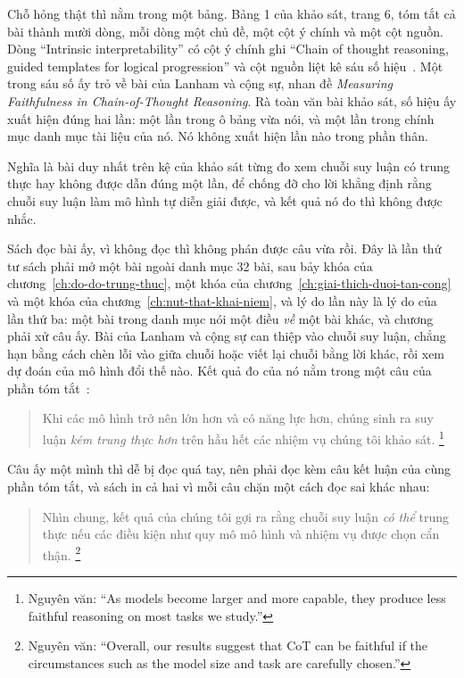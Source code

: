 %
Chỗ hỏng thật thì nằm trong một bảng. Bảng 1 của khảo sát, trang 6, tóm tắt cả
bài thành mười dòng, mỗi dòng một chủ đề, một cột ý chính và một cột nguồn. Dòng
\enquote{Intrinsic interpretability} có cột ý chính ghi \enquote{Chain of thought
reasoning, guided templates for logical progression} và cột nguồn liệt kê sáu số
hiệu~\autocite{p16llmxai}. Một trong sáu số ấy trỏ về bài của Lanham và cộng sự,
nhan đề \emph{Measuring Faithfulness in Chain-of-Thought Reasoning}. Rà toàn văn
bài khảo sát, số hiệu ấy xuất hiện đúng hai lần: một lần trong ô bảng vừa nói, và
một lần trong chính mục danh mục tài liệu của nó. Nó không xuất hiện lần nào
trong phần thân.

Nghĩa là bài duy nhất trên kệ của khảo sát từng đo xem chuỗi suy luận có trung
thực hay không được dẫn đúng một lần, để chống đỡ cho lời khẳng định rằng chuỗi
suy luận làm mô hình tự diễn giải được, và kết quả nó đo thì không được nhắc.

%
Sách đọc bài ấy, vì không đọc thì không phán được câu vừa rồi. Đây là lần thứ tư
sách phải mở một bài ngoài danh mục 32 bài, sau bảy khóa của
chương~\ref{ch:do-do-trung-thuc}, một khóa của
chương~\ref{ch:giai-thich-duoi-tan-cong} và một khóa của
chương~\ref{ch:nut-that-khai-niem}, và lý do lần này là lý do của lần thứ ba: một
bài trong danh mục nói một điều \emph{về} một bài khác, và chương phải xử câu ấy.
Bài của Lanham và cộng sự can thiệp vào chuỗi suy luận, chẳng hạn bằng cách chèn
lỗi vào giữa chuỗi hoặc viết lại chuỗi bằng lời khác, rồi xem dự đoán của mô hình
đổi thế nào. Kết quả đo của nó nằm trong một câu của phần tóm
tắt~\autocite{mcotfaith}:

\begin{quote}
Khi các mô hình trở nên lớn hơn và có năng lực hơn, chúng sinh ra suy luận
\emph{kém trung thực hơn} trên hầu hết các nhiệm vụ chúng tôi khảo sát.%
\footnote{Nguyên văn: \enquote{As models become larger and more capable, they
produce less faithful reasoning on most tasks we study.}}
\end{quote}

Câu ấy một mình thì dễ bị đọc quá tay, nên phải đọc kèm câu kết luận của cùng
phần tóm tắt, và sách in cả hai vì mỗi câu chặn một cách đọc sai khác nhau:

\begin{quote}
Nhìn chung, kết quả của chúng tôi gợi ra rằng chuỗi suy luận \emph{có thể} trung
thực nếu các điều kiện như quy mô mô hình và nhiệm vụ được chọn cẩn thận.%
\footnote{Nguyên văn: \enquote{Overall, our results suggest that CoT can be
faithful if the circumstances such as the model size and task are carefully
chosen.}}
\end{quote}

